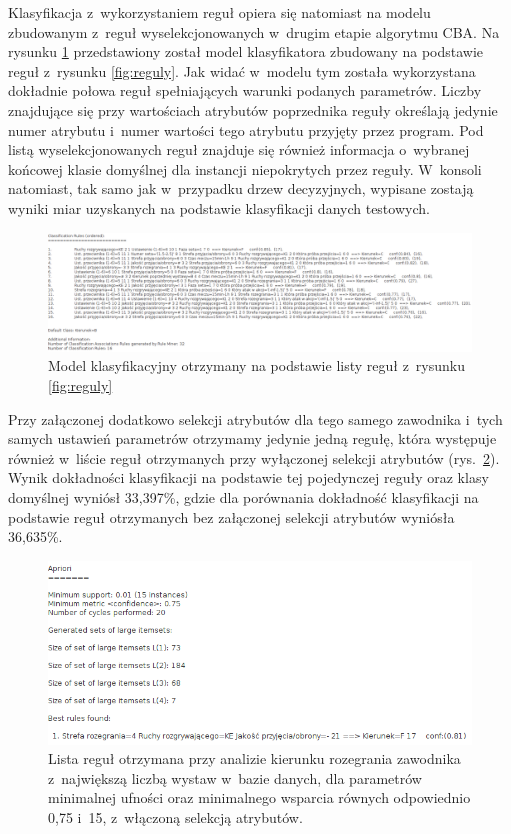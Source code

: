 \documentclass[a4paper,twoside,12pt]{book}
\begin{document}
Klasyfikacja z~wykorzystaniem reguł opiera się natomiast na modelu zbudowanym z~reguł wyselekcjonowanych w~drugim etapie algorytmu CBA. Na rysunku \ref{fig:reguly-model} przedstawiony został model klasyfikatora zbudowany na podstawie reguł z~rysunku \ref{fig:reguly}. Jak widać w~modelu tym została wykorzystana dokładnie połowa reguł spełniających warunki podanych parametrów. Liczby znajdujące się przy wartościach atrybutów poprzednika reguły określają jedynie numer atrybutu i~numer wartości tego atrybutu przyjęty przez program. Pod listą wyselekcjonowanych reguł znajduje się również informacja o~wybranej końcowej klasie domyślnej dla instancji niepokrytych przez reguły. W~konsoli natomiast, tak samo jak w~przypadku drzew decyzyjnych, wypisane zostają wyniki miar uzyskanych na podstawie klasyfikacji danych testowych.

\begin{figure}
\centering
\includegraphics[width=\columnwidth]{reguly-model}
\caption{Model klasyfikacyjny otrzymany na podstawie listy reguł z~rysunku \ref{fig:reguly}}
\label{fig:reguly-model}
\end{figure}

Przy załączonej dodatkowo selekcji atrybutów dla tego samego zawodnika i~tych samych ustawień parametrów otrzymamy jedynie jedną regułę, która występuje również w~liście reguł otrzymanych przy wyłączonej selekcji atrybutów (rys.~\ref{fig:reguly-selekcja}). Wynik dokładności klasyfikacji na podstawie tej pojedynczej reguły oraz klasy domyślnej wyniósł 33,397\%, gdzie dla porównania dokładność klasyfikacji na podstawie reguł otrzymanych bez załączonej selekcji atrybutów wyniósła 36,635\%. 

\begin{figure}
\centering
\includegraphics[width=\columnwidth]{reguly-selekcja}
\caption{Lista reguł otrzymana przy analizie kierunku rozegrania zawodnika z~największą liczbą wystaw w~bazie danych, dla parametrów minimalnej ufności oraz minimalnego wsparcia równych odpowiednio 0,75 i~15, z~włączoną selekcją atrybutów.}
\label{fig:reguly-selekcja}
\end{figure}
\end{document}
